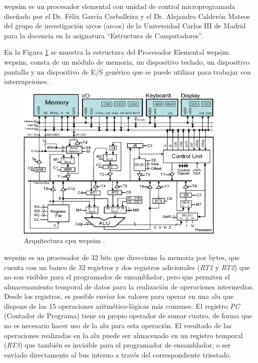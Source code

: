 \acrshort{wepsim} es un procesador elemental con unidad de control microprogramada diseñado por el Dr. Félix García Carballeira y el Dr. Alejandro Calderón Mateos del grupo de investigación \acrshort{arcos} (\acrlong{arcos}) de la Universidad Carlos III de Madrid para la docencia en la asignatura ``Estructura de Computadores''.

En la Figura \ref{fig:wepsimCPU_figure} se muestra la estructura del Procesador Elemental \acrshort{wepsim}. \acrshort{wepsim}, consta de un módulo de memoria, un dispositivo teclado, un dispositivo pantalla y un dispositivo de E/S genérico que se puede utilizar para trabajar con interrupciones.

\begin{figure}[htbp]
 	\centering
 	\includegraphics[width=0.9\textwidth]{figures/processor6}
 	\caption{Arquitectura \acrshort{cpu} \acrshort{wepsim} .}
	\label{fig:wepsimCPU_figure}
\end{figure}


\acrshort{wepsim} es un procesador de 32 bits que direcciona la memoria por bytes, que cuenta con un banco de 32 registros y dos registros adicionales (\emph{RT1} y \emph{RT2}) que no son visibles para el programador de \gls{ensamblador}, pero que permiten el almacenamiento temporal de datos para la realización de operaciones intermedias. Desde los registros, es posible enviar los valores para operar en una \acrfull{alu} que dispone de las 15 operaciones aritmético-lógicas más comunes. El registro \emph{PC} (Contador de Programa) tiene su propio operador de sumar cuatro, de forma que no es necesario hacer uso de la \acrshort{alu} para esta operación. El resultado de las operaciones realizadas en la \acrshort{alu} puede ser almacenado en un registro temporal (\emph{RT3}) que también es invisible para el programador de \gls{ensamblador}, o ser enviado directamente al bus interno a través del correspondiente triestado.

